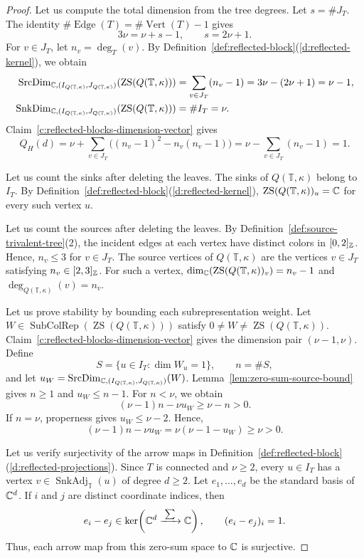 \begin{proof}
 Let us compute the total dimension from the tree degrees.
Let $s=\#J_{T}$.
The identity $\#\operatorname{Edge}(T)=\#\operatorname{Vert}(T)-1$ gives
\[
 3\nu=\nu+s-1,\qquad s=2\nu+1.
\]
For $v\in J_{T}$, let $n_v=\deg_T(v)$.
By Definition~\ref{def:reflected-block}(\ref{d:reflected-kernel}), we obtain
\[
\begin{aligned}
 \operatorname{SrcDim}_{\mathbb C,(I_{Q(\mathbb T,\kappa)},J_{Q(\mathbb T,\kappa)})}(\operatorname{ZS}(Q(\mathbb T,\kappa)))
 &=\sum_{v\in J_{T}}(n_v-1)=3\nu-(2\nu+1)=\nu-1,\\
 \operatorname{SnkDim}_{\mathbb C,(I_{Q(\mathbb T,\kappa)},J_{Q(\mathbb T,\kappa)})}(\operatorname{ZS}(Q(\mathbb T,\kappa)))&=\#I_{T}=\nu.
\end{aligned}
\]
 Claim~\ref{c:reflected-blocks-dimension-vector} gives
\[
Q_H(d)=\nu+\sum_{v\in J_{T}}\bigl((n_v-1)^2-n_v(n_v-1)\bigr)
 =\nu-\sum_{v\in J_{T}}(n_v-1)=1.
\]

 Let us count the sinks after deleting the leaves.
The sinks of $Q(\mathbb T,\kappa)$ belong to
$I_{T}$. By Definition~\ref{def:reflected-block}(\ref{d:reflected-kernel}),
$\operatorname{ZS}(Q(\mathbb T,\kappa))_u=\mathbb C$ for every such vertex $u$.

 Let us count the sources after deleting the leaves.
By Definition~\ref{def:source-trivalent-tree}(2), the incident edges at each vertex have distinct colors in $[0,2]_{\mathbb Z}$. Hence, $n_v\le3$ for $v\in J_T$.
The source vertices of $Q(\mathbb T,\kappa)$ are
the vertices $v\in J_{T}$ satisfying $n_v\in[2,3]_{\mathbb Z}$.
For such a vertex, $\dim_{\mathbb C}(\operatorname{ZS}(Q(\mathbb T,\kappa))_v)=n_v-1$ and $\deg_{Q(\mathbb T,\kappa)}(v)=n_v$.

 Let us prove stability by bounding each subrepresentation weight.
Let $W\in\operatorname{SubColRep}(\operatorname{ZS}(Q(\mathbb T,\kappa)))$ satisfy $0\ne W\ne\operatorname{ZS}(Q(\mathbb T,\kappa))$.
Claim~\ref{c:reflected-blocks-dimension-vector} gives the dimension pair $(\nu-1,\nu)$.
Define
\[
 S=\{u\in I_{T}:\dim W_u=1\},\qquad n=\#S,
\]
and let $u_W=\operatorname{SrcDim}_{\mathbb C,(I_{Q(\mathbb T,\kappa)},J_{Q(\mathbb T,\kappa)})}(W)$.
Lemma~\ref{lem:zero-sum-source-bound} gives $n\ge1$ and $u_W\le n-1$.
For $n<\nu$, we obtain
\[
 (\nu-1)n-\nu u_W\ge\nu-n>0.
\]
If $n=\nu$, properness gives $u_W\le\nu-2$. Hence,
\[
 (\nu-1)n-\nu u_W=\nu(\nu-1-u_W)\ge\nu>0.
\]

 Let us verify surjectivity of the arrow maps in Definition~\ref{def:reflected-block}(\ref{d:reflected-projections}).
Since $T$ is connected and $\nu\ge2$, every $u\in I_{T}$
has a vertex $v\in\operatorname{SnkAdj}_{\mathbb T}(u)$ of degree $d\ge2$.
Let $e_1,\ldots,e_d$ be the standard basis of $\mathbb C^d$.
If $i$ and $j$ are distinct coordinate indices, then
\[
 e_i-e_j\in\ker\!\left(\mathbb C^d\xrightarrow{\;\sum\;}\mathbb C\right),
 \qquad (e_i-e_j)_i=1.
\]
Thus, each arrow map from this zero-sum space to $\mathbb C$ is surjective.
\end{proof}

